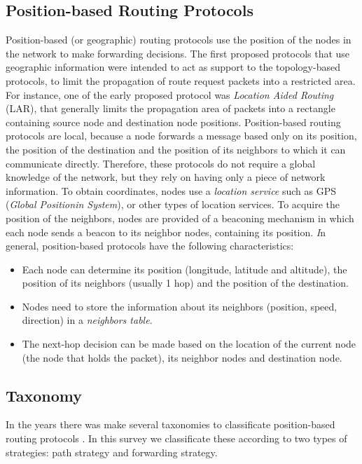 \documentclass[journal,comsoc]{IEEEtran}
\begin{document}
\subsection{Position-based Routing Protocols}
Position-based (or geographic) routing protocols use the position of the nodes in the network to make forwarding decisions. The first proposed protocols that use geographic information were intended to act as support to the topology-based protocols, to limit the propagation of route request packets into a restricted area. For instance, one of the early proposed protocol was \emph{Location Aided Routing} (LAR), that generally limits the propagation area of packets into a rectangle containing source node and destination node positions. Position-based routing protocols are local, because a node forwards a message based only on its position, the position of the destination and the position of its neighbors to which it can communicate directly. Therefore, these protocols do not require a global knowledge of the network, but they rely on having only a piece of network information. To obtain coordinates, nodes use a \emph{location service} such as GPS (\emph{Global Positionin System}), or other types of location services. To acquire the position of the neighbors, nodes are provided of a beaconing mechanism in which each node sends a beacon to its neighbor nodes, containing its position.
\emph In general, position-based protocols have the following characteristics:
\begin{itemize}
\item Each node can determine its position (longitude, latitude and altitude), the position of its neighbors (usually 1 hop) and the position of the destination.
\item Nodes need to store the information about its neighbors (position, speed, direction) in a \emph{neighbors table}.
\item The next-hop decision can be made based on the location of the current node (the node that holds the packet), its neighbor nodes and destination node.
\end{itemize}

\subsection{Taxonomy}
In the years there was make several taxonomies to classificate position-based routing protocols \cite{azz:survey, kun:survey}. In this survey we classificate these according to two types of strategies: path strategy and forwarding strategy.
\end{document}
